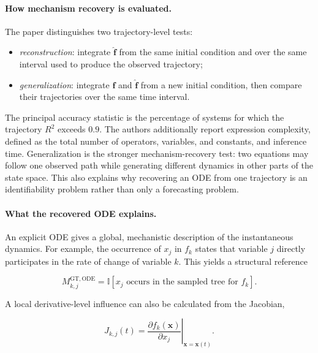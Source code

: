 \paragraph{How mechanism recovery is evaluated.}
The paper distinguishes two trajectory-level tests:

\begin{itemize}
    \item \emph{reconstruction}: integrate $\widehat{\mathbf f}$ from the same
    initial condition and over the same interval used to produce the observed
    trajectory;
    \item \emph{generalization}: integrate $\mathbf f$ and
    $\widehat{\mathbf f}$ from a new initial condition, then compare their
    trajectories over the same time interval.
\end{itemize}

The principal accuracy statistic is the percentage of systems for which the
trajectory $R^2$ exceeds $0.9$. The authors additionally report expression
complexity, defined as the total number of operators, variables, and constants,
and inference time. Generalization is the stronger mechanism-recovery test: two
equations may follow one observed path while generating different dynamics in
other parts of the state space. This also explains why recovering an ODE from
one trajectory is an identifiability problem rather than only a forecasting
problem.

\paragraph{What the recovered ODE explains.}
An explicit ODE gives a global, mechanistic description of the instantaneous
dynamics. For example, the occurrence of $x_j$ in $f_k$ states that variable
$j$ directly participates in the rate of change of variable $k$. This yields a
structural reference

\begin{equation}
M^{\mathrm{GT,ODE}}_{k,j}
=\mathbb I[x_j\text{ occurs in the sampled tree for }f_k].
\label{eq:odeformer-structural-gt}
\end{equation}

A local derivative-level influence can also be calculated from the Jacobian,

\begin{equation}
J_{k,j}(t)=
\left.\frac{\partial f_k(\mathbf x)}{\partial x_j}
\right|_{\mathbf x=\mathbf x(t)}.
\label{eq:odeformer-jacobian}
\end{equation}

